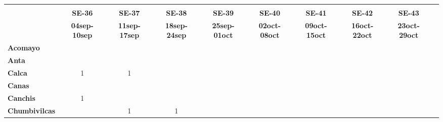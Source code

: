 \begin{tabular}{lccccccccc}
	\textbf{}              	  
	& \multicolumn{1}{l}{}                        
	& \multicolumn{1}{l}{}      
	& \multicolumn{1}{l}{}                         
	& \multicolumn{1}{l}{}                         
	& \multicolumn{1}{l}{}                         
	& \multicolumn{1}{l}{}                        
	& \multicolumn{1}{l}{}                         
	& \multicolumn{1}{l}{} \\                   
	\textbf{}  															
	&\textbf{SE-36}
	&\textbf{SE-37}
	&\textbf{SE-38}
	&\textbf{SE-39}
	&\textbf{SE-40}
	&\textbf{SE-41}
	&\textbf{SE-42}
	&\textbf{SE-43}	\\							
	\textbf{}      							
	&\textbf{04sep-10sep}
	&\textbf{11sep-17sep}
	&\textbf{18sep-24sep} 
	&\textbf{25sep-01oct} 
	&\textbf{02oct-08oct}
	&\textbf{09oct-15oct}
	&\textbf{16oct-22oct}
	&\textbf{23oct-29oct}\\
	\textbf{Acomayo}                        												
	&\cellcolor[HTML]{FCC46C}
	&\cellcolor[HTML]{FCC46C}					
	&\cellcolor[HTML]{FCC46C}
	&\cellcolor[HTML]{FCC46C}					
	&\cellcolor[HTML]{FCC46C}
	&\cellcolor[HTML]{FCC46C} 
	&\cellcolor[HTML]{FCC46C}
	&\cellcolor[HTML]{FCC46C}\\
	\textbf{Anta}                                                  							&\cellcolor[HTML]{FCC46C}						
	&\cellcolor[HTML]{FCC46C}					
	&\cellcolor[HTML]{FCC46C}					
	&\cellcolor[HTML]{FCC46C}					
	&\cellcolor[HTML]{FCC46C}
	&\cellcolor[HTML]{FCC46C}	
	&\cellcolor[HTML]{FCC46C}
	&\cellcolor[HTML]{FCC46C}\\					
	\textbf{Calca} 												
	&1
	&1
	&\cellcolor[HTML]{FCC46C}
	&\cellcolor[HTML]{FCC46C}
	&\cellcolor[HTML]{FCC46C}
	&\cellcolor[HTML]{FCC46C}
	&\cellcolor[HTML]{FCC46C}
	&\cellcolor[HTML]{FCC46C}\\          			
	\textbf{Canas}     			
	&\cellcolor[HTML]{FCC46C}					
	&\cellcolor[HTML]{FCC46C}
	&\cellcolor[HTML]{FCC46C}	
	&\cellcolor[HTML]{FCC46C}
	&\cellcolor[HTML]{FCC46C}
	&\cellcolor[HTML]{FCC46C}
	&\cellcolor[HTML]{FCC46C}
	&\cellcolor[HTML]{FCC46C}\\	
	\textbf{Canchis}   							
	&1
	&\cellcolor[HTML]{FCC46C}
	&\cellcolor[HTML]{FCC46C}
	&\cellcolor[HTML]{FCC46C}
	&\cellcolor[HTML]{FCC46C}
	&\cellcolor[HTML]{FCC46C}
	&\cellcolor[HTML]{FCC46C}
	&\cellcolor[HTML]{FCC46C}\\											
	\textbf{Chumbivilcas}                      												
	&\cellcolor[HTML]{FCC46C}
	&1
	&1
	&\cellcolor[HTML]{FCC46C}
	&\cellcolor[HTML]{FCC46C}

\end{tabular}
